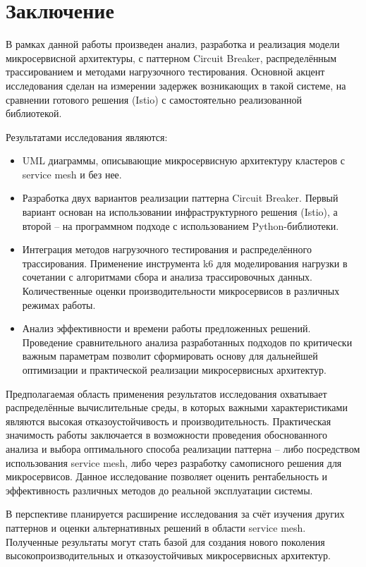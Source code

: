 \chapter*{Заключение}


В рамках данной работы произведен анализ, разработка и реализация модели микросервисной архитектуры, с паттерном Circuit Breaker, распределённым трассированием и методами нагрузочного тестирования. Основной акцент исследования сделан на измерении задержек возникающих в такой системе, на сравнении готового решения (Istio) с самостоятельно реализованной библиотекой.

Результатами исследования являются:
\begin{itemize}
    \item UML диаграммы, описывающие микросервисную архитектуру кластеров с service mesh и без нее. 
    \item Разработка двух вариантов реализации паттерна Circuit Breaker. Первый вариант основан на использовании инфраструктурного решения (Istio), а второй – на программном подходе с использованием Python-библиотеки. 
    \item Интеграция методов нагрузочного тестирования и распределённого трассирования. Применение инструмента k6 для моделирования нагрузки в сочетании с алгоритмами сбора и анализа трассировочных данных. Количественные оценки производительности микросервисов в различных режимах работы.
    \item Анализ эффективности и времени работы предложенных решений. Проведение сравнительного анализа разработанных подходов по критически важным параметрам позволит сформировать основу для дальнейшей оптимизации и практической реализации микросервисных архитектур. 
\end{itemize}

Предполагаемая область применения результатов исследования охватывает распределённые вычислительные среды, в которых важными характеристиками являются высокая отказоустойчивость и производительность. Практическая значимость работы заключается в возможности проведения обоснованного анализа и выбора оптимального способа реализации паттерна – либо посредством использования service mesh, либо через разработку самописного решения для микросервисов. Данное исследование позволяет оценить рентабельность и эффективность различных методов до реальной эксплуатации системы.

В перспективе планируется расширение исследования за счёт изучения других паттернов и оценки альтернативных решений в области service mesh. Полученные результаты могут стать базой для создания нового поколения высокопроизводительных и отказоустойчивых микросервисных архитектур.

